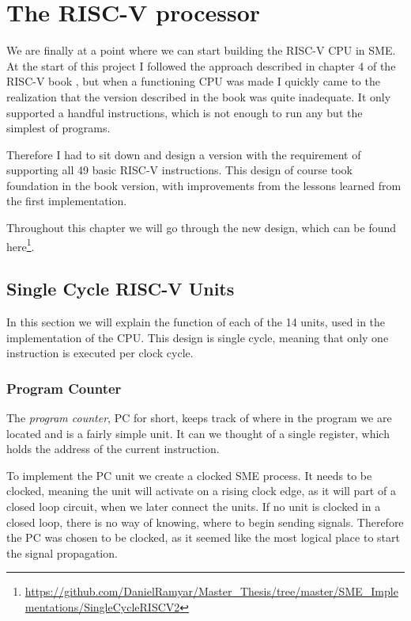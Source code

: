 \chapter{The RISC-V processor}
    We are finally at a point where we can start building the RISC-V CPU in SME. At the start of this project I followed the approach described in chapter 4 of the RISC-V book \cite{riscVbook}, but when a functioning CPU was made I quickly came to the realization that the version described in the book was quite inadequate. It only supported a handful instructions, which is not enough to run any but the simplest of programs. 
    
    Therefore I had to sit down and design a version with the requirement of supporting all 49 basic RISC-V instructions. This design of course took foundation in the book version, with improvements from the lessons learned from the first implementation.
    
    Throughout this chapter we will go through the new design, which can be found here\footnote{\url{https://github.com/DanielRamyar/Master_Thesis/tree/master/SME_Implementations/SingleCycleRISCV2}}.

\section{Single Cycle RISC-V Units}
    In this section we will explain the function of each of the 14 units, used in the implementation of the CPU. This design is single cycle, meaning that only one instruction is executed per clock cycle. 

    \subsection{Program Counter}
        The \textit{program counter}, PC for short, keeps track of where in the program we are located and is a fairly simple unit. It can we thought of a single register, which holds the address of the current instruction.
        
        To implement the PC unit we create a clocked SME process. It needs to be clocked, meaning the unit will activate on a rising clock edge, as it will part of a closed loop circuit, when we later connect the units. If no unit is clocked in a closed loop, there is no way of knowing, where to begin sending signals. Therefore the PC was chosen to be clocked, as it seemed like the most logical place to start the signal propagation.
        
